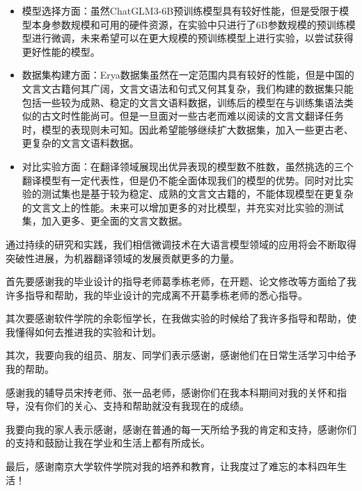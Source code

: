 \documentclass[
    decl-page,  %
    ,fontset = win, %
  ]{njuthesis}
\begin{document}
\begin{itemize}
    \item 模型选择方面：虽然ChatGLM3-6B预训练模型具有较好性能，但是受限于模型本身参数规模和可用的硬件资源，在实验中只进行了6B参数规模的预训练模型进行微调，未来希望可以在更大规模的预训练模型上进行实验，以尝试获得更好性能的模型。
    \item 数据集构建方面：Erya数据集虽然在一定范围内具有较好的性能，但是中国的文言文古籍何其广阔，文言文语法和句式又何其复杂，我们构建的数据集只能包括一些较为成熟、稳定的文言文语料数据，训练后的模型在与训练集语法类似的古文时性能尚可。但是一旦面对一些古老而难以阅读的文言文翻译任务时，模型的表现则未可知。因此希望能够继续扩大数据集，加入一些更古老、更复杂的文言文语料数据。
    \item 对比实验方面：在翻译领域展现出优异表现的模型数不胜数，虽然挑选的三个翻译模型有一定代表性，但是仍不能全面体现我们的模型的优势。同时对比实验的测试集也是基于较为稳定、成熟的文言文古籍的，不能体现模型在更复杂的文言文上的性能。未来可以增加更多的对比模型，并充实对比实验的测试集，加入更多、更全面的文言文数据。
\end{itemize}

通过持续的研究和实践，我们相信微调技术在大语言模型领域的应用将会不断取得突破性进展，为机器翻译领域的发展贡献更多的力量。
 

\printbibliography


\begin{acknowledgement}
首先要感谢我的毕业设计的指导老师葛季栋老师，在开题、论文修改等方面给了我许多指导和帮助，我的毕业设计的完成离不开葛季栋老师的悉心指导。

其次要感谢软件学院的余彰恒学长，在我做实验的时候给了我许多指导和帮助，使我懂得如何去推进我的实验和计划。

其次，我要向我的组员、朋友、同学们表示感谢，感谢他们在日常生活学习中给予我的帮助。

感谢我的辅导员宋抟老师、张一品老师，感谢你们在我本科期间对我的关怀和指导，没有你们的关心、支持和帮助就没有我现在的成绩。

我要向我的家人表示感谢，感谢在普通的每一天所给予我的肯定和支持，感谢你们的支持和鼓励让我在学业和生活上都有所成长。

最后，感谢南京大学软件学院对我的培养和教育，让我度过了难忘的本科四年生活！
\end{acknowledgement}

\end{document}
